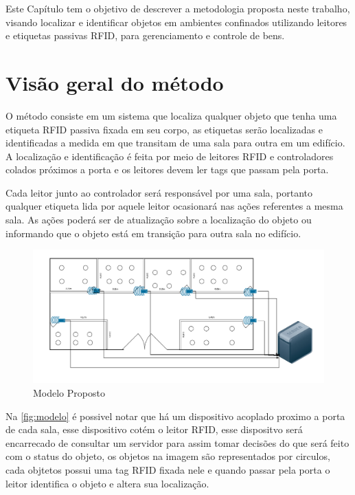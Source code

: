 
\label{chapter:metodo}
Este Capítulo tem o objetivo de descrever a metodologia proposta neste trabalho, visando localizar e identificar objetos em ambientes confinados utilizando leitores e etiquetas passivas RFID, para gerenciamento e controle de bens.

\section{Visão geral do método}
O método consiste em um sistema que localiza qualquer objeto que tenha uma etiqueta RFID passiva fixada em seu corpo, as etiquetas serão localizadas e identificadas a medida em que transitam de uma sala para outra em um edifício. A localização e identificação é feita por meio de leitores RFID e controladores colados próximos a porta e os leitores devem ler tags que passam pela porta.
\par
Cada leitor junto ao controlador será responsável por uma sala, portanto qualquer etiqueta lida por aquele leitor ocasionará nas ações referentes a mesma sala. As ações poderá ser de atualização sobre a localização do objeto ou informando que o objeto está em transição para outra sala no edifício.
\begin{figure}[H]
              \caption{\label{fig:modelo}{Modelo Proposto}}
              \centering
              \includegraphics[width=1.0\textwidth]{Figuras/visao_geral.png}
        \end{figure}
\par
Na \autoref{fig:modelo} é possivel notar que há um dispositivo acoplado proximo a porta de cada sala, esse dispositivo cotém o leitor RFID, esse dispositvo será encarrecado de consultar um servidor para assim tomar decisões do que será feito com o status do objeto, os objetos na imagem são representados por circulos, cada objtetos possui uma tag RFID fixada nele e quando passar pela porta o leitor identifica o objeto e altera sua localização. 
